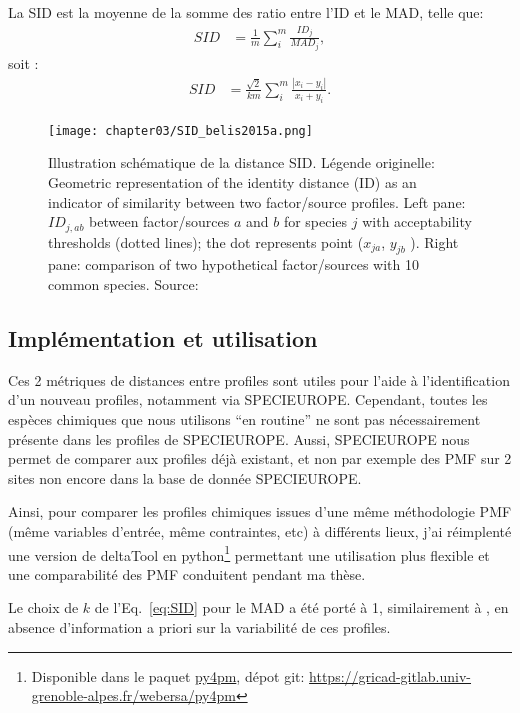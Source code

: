 La SID est la moyenne de la somme des ratio entre l'ID et le MAD, telle que:
\begin{align}
    \label{eq:SIDi}
    SID &= \frac{1}{m}\sum_i^m\frac{ID_j}{MAD_j},
\end{align}
soit :
\begin{align}
    \label{eq:SID}
    SID &= \frac{\sqrt{2}}{km} \sum_i^m \frac{|x_i - y_i|}{x_i + y_i}.
\end{align}

\begin{figure}[ht]
    \centering
    \texttt{[image: chapter03/SID\_belis2015a.png]}
    \caption{Illustration schématique de la distance SID. Légende originelle:
        Geometric representation of the identity distance (ID) as an indicator of
        similarity between two factor/source profiles. Left pane: $ID_{j,ab}$ between
        factor/sources $a$ and $b$ for species $j$ with acceptability thresholds (dotted lines);
        the dot represents point ($x_{ja}$, $y_{jb}$ ). Right pane: comparison of two
        hypothetical factor/sources with 10 common species.
        Source: \cite[figure 2]{belisNew2015}
}%
    \label{fig:chapter03/SID_belis2015a}
\end{figure}

\subsection{Implémentation et utilisation}%
\label{sub:implémentation_et_utilisation}

Ces 2 métriques de distances entre profiles sont utiles pour l'aide à l'identification
d'un nouveau profiles, notamment via SPECIEUROPE. Cependant, toutes les espèces chimiques
que nous utilisons ``en routine'' ne sont pas nécessairement présente dans les profiles de
SPECIEUROPE. Aussi, SPECIEUROPE nous permet de comparer aux profiles déjà existant, et non
par exemple des PMF sur 2 sites non encore dans la base de donnée SPECIEUROPE.

Ainsi, pour comparer les profiles chimiques issues d'une même méthodologie PMF (même
variables d'entrée, même contraintes, etc) à différents lieux, j'ai réimplenté une version
de deltaTool en python\footnote{Disponible dans le paquet
    \href{https://pypi.org/project/py4pm/}{py4pm}, dépot git:
\url{https://gricad-gitlab.univ-grenoble-alpes.fr/webersa/py4pm}
} permettant une
utilisation plus flexible et une comparabilité des PMF conduitent pendant ma thèse.

Le choix de $k$ de l'Eq.~\ref{eq:SID} pour le MAD a été porté à 1, similairement à
\cite{pernigottiDeltaSA2018}, en absence d'information a priori sur la variabilité de ces
profiles.

